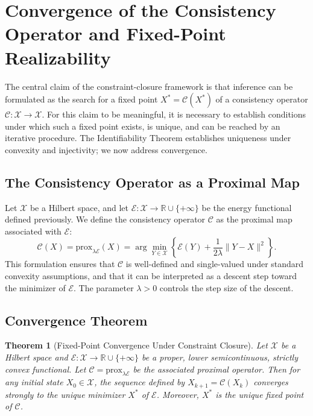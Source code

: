 \documentclass[11pt, oneside]{article}
\newtheorem{theorem}{Theorem}
\begin{document}
\section{Convergence of the Consistency Operator and Fixed-Point Realizability}

The central claim of the constraint-closure framework is that inference can be formulated as the search for a fixed point $X^\ast = \mathcal{C}(X^\ast)$ of a consistency operator $\mathcal{C} : \mathcal{X} \to \mathcal{X}$. For this claim to be meaningful, it is necessary to establish conditions under which such a fixed point exists, is unique, and can be reached by an iterative procedure. The Identifiability Theorem establishes uniqueness under convexity and injectivity; we now address convergence.

\subsection{The Consistency Operator as a Proximal Map}

Let $\mathcal{X}$ be a Hilbert space, and let $\mathcal{E} : \mathcal{X} \to \mathbb{R} \cup \{+\infty\}$ be the energy functional defined previously. We define the consistency operator $\mathcal{C}$ as the proximal map associated with $\mathcal{E}$:
\[
\mathcal{C}(X) = \mathrm{prox}_{\lambda \mathcal{E}}(X) = \arg\min_{Y \in \mathcal{X}} \left\{ \mathcal{E}(Y) + \frac{1}{2\lambda}\|Y - X\|^2 \right\}.
\]
This formulation ensures that $\mathcal{C}$ is well-defined and single-valued under standard convexity assumptions, and that it can be interpreted as a descent step toward the minimizer of $\mathcal{E}$. The parameter $\lambda > 0$ controls the step size of the descent.

\subsection{Convergence Theorem}

\begin{theorem}[Fixed-Point Convergence Under Constraint Closure]
Let $\mathcal{X}$ be a Hilbert space and $\mathcal{E} : \mathcal{X} \to \mathbb{R} \cup \{+\infty\}$ be a proper, lower semicontinuous, strictly convex functional. Let $\mathcal{C} = \mathrm{prox}_{\lambda \mathcal{E}}$ be the associated proximal operator. Then for any initial state $X_0 \in \mathcal{X}$, the sequence defined by $X_{k+1} = \mathcal{C}(X_k)$ converges strongly to the unique minimizer $X^\ast$ of $\mathcal{E}$. Moreover, $X^\ast$ is the unique fixed point of $\mathcal{C}$.
\end{theorem}
\end{document}
